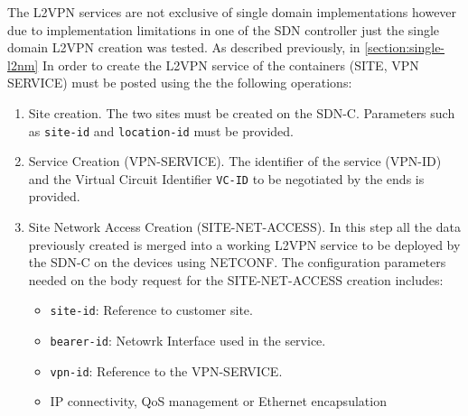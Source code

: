 \documentclass[a4paper,fleqn]{cas-dc}
\begin{document}
The L2VPN services are not exclusive of single domain implementations however due to implementation limitations in one of the SDN controller just the single domain L2VPN creation was tested. As described previously, in \ref{section:single-l2nm} In order to create the L2VPN service of the containers (SITE, VPN SERVICE) must be posted using the the following operations:

\begin{enumerate}
    \item Site creation. The two sites must be created on the SDN-C. Parameters such as \texttt{site-id} and \texttt{location-id}  must be provided.
    \item Service Creation (VPN-SERVICE). The identifier of the service (VPN-ID) and the Virtual Circuit Identifier \texttt{VC-ID} to be negotiated by the ends is provided.  
    \item Site Network Access Creation (SITE-NET-ACCESS). In this step all the data previously created is merged into a working L2VPN service to be deployed by the SDN-C on the devices using NETCONF. The configuration parameters needed on the body request for the SITE-NET-ACCESS creation includes: 
    \begin{itemize}
        \item \texttt{site-id}: Reference to customer site.
        \item \texttt{bearer-id}: Netowrk Interface used in the service.
        \item \texttt{vpn-id}: Reference to the VPN-SERVICE.
        \item IP connectivity, QoS management or Ethernet encapsulation
    \end{itemize}
\end{enumerate}
\end{document}
